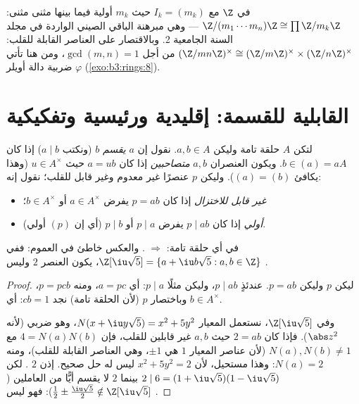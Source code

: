 \begin{example}\label{ex:b3:rings:crtz}
في $\Z$ مع $I_k = (m_k)$ حيث $m_k$ أولية فيما بينها مثنى مثنى:
$\Z/(m_1\cdots
m_n)\Z \cong \prod \Z/m_k\Z$ --- وهي مبرهنة الباقي الصيني الواردة في مجلد السنة
الجامعية 2. وبالاقتصار على العناصر القابلة للقلب: $(\Z/mn\Z)^\times \cong
(\Z/m\Z)^\times \times (\Z/n\Z)^\times$ من أجل
$\gcd(m,n)=1$، ومن هنا تأتي ضربية دالة أويلر $\varphi$
(\cref{exo:b3:rings:8}).
\end{example}

\section{القابلية للقسمة: إقليدية ورئيسية وتفكيكية}

\begin{definition}\label{def:b3:rings:divisibility}
لتكن $A$ حلقة تامة وليكن $a, b \in A$. نقول إن $a$ \emph{يقسم}
$b$ (ونكتب $a \mid b$) إذا كان $b \in (a) = aA$. ويكون العنصران
$a,
b$ \emph{متصاحبين} إذا كان $a = ub$
حيث $u \in A^\times$ (وهذا يكافئ $(a) = (b)$). وليكن $p$ عنصرًا
غير معدوم وغير قابل للقلب؛ نقول إنه:
\begin{itemize}
  \item \emph{غير قابل للاختزال}
        إذا كان $p = ab$ يفرض $a \in A^\times$ أو
        $b \in A^\times$؛
  \item \emph{أولي} إذا كان $p \mid ab$ يفرض
        $p
        \mid a$ أو $p \mid b$ (أي إن  $(p)$ أولي).
\end{itemize}
\end{definition}

\begin{proposition}\label{prop:b3:rings:primeirred}
في أي حلقة تامة:  $\Rightarrow$ . والعكس
خاطئ في العموم: ففي $\Z[\iu\sqrt 5] = \{a + \iu b\sqrt5 : a, b
\in \Z\}$، يكون العنصر $2$ 
وليس .
\end{proposition}

\begin{proof}
ليكن $p$  وليكن $p = ab$. عندئذٍ $p \mid ab$، وليكن مثلًا
$p \mid a$: أي $a = pc$، ومنه $p = pcb$، وباختصار $p$ (لأن
الحلقة تامة) نجد $cb =
1$: أي $b \in A^\times$.

وفي $\Z[\iu\sqrt5]$، نستعمل المعيار $N(x + \iu y\sqrt 5) = x^2 +
5y^2$، وهو ضربي (لأنه
$\abs z^2$). فإذا كان $2 = ab$ حيث $a, b$ غير قابلين للقلب، فإن
$4 = N(a)N(b)$ مع $N(a), N(b) \neq
1$ (لأن عناصر المعيار $1$ هي $\pm1$، وهي
العناصر القابلة للقلب)، ومنه $N(a) = 2$: وهذا مستحيل، لأن
$x^2 + 5y^2 = 2$ ليس له حل صحيح. إذن $2$ . لكن
$2 \mid 6 = (1 + \iu\sqrt5)(1 - \iu\sqrt5)$ بينما $2$ لا يقسم أيًّا من العاملين ($\frac12 \pm \frac{\iu\sqrt5}2
\notin \Z[\iu\sqrt5]$): فهو ليس
.
\end{proof}

